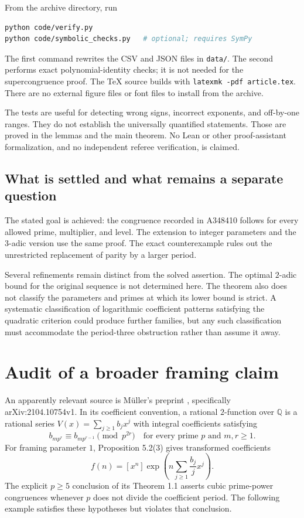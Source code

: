 \documentclass[11pt,a4paper]{article}
\numberwithin{equation}{section}
\theoremstyle{definition}
\theoremstyle{remark}
\newcommand{\Q}{\mathbb Q}
\begin{document}
From the archive directory, run
\begin{lstlisting}[language=bash]
python code/verify.py
python code/symbolic_checks.py   # optional; requires SymPy
\end{lstlisting}
The first command rewrites the CSV and JSON files in \texttt{data/}.
The second performs exact polynomial-identity checks; it is not needed
for the supercongruence proof. The TeX source builds with
\texttt{latexmk -pdf article.tex}. There are no external figure files or
font files to install from the archive.

The tests are useful for detecting wrong signs, incorrect exponents,
and off-by-one ranges. They do not establish the universally quantified
statements. Those are proved in the lemmas and the main theorem. No
Lean or other proof-assistant formalization, and no independent referee
verification, is claimed.

\subsection{What is settled and what remains a separate question}

The stated goal is achieved: the congruence recorded in A348410 follows
for every allowed prime, multiplier, and level. The extension to integer
parameters and the $3$-adic version use the same proof. The exact
counterexample rules out the unrestricted replacement of parity by a
larger period.

Several refinements remain distinct from the solved assertion. The
optimal $2$-adic bound for the original sequence is not determined here.
The theorem also does not classify the parameters and primes at which
its lower bound is strict. A systematic classification of logarithmic
coefficient patterns satisfying the quadratic criterion could produce
further families, but any such classification must accommodate the
period-three obstruction rather than assume it away.

\appendix
\section{Audit of a broader framing claim}\label{app:audit}

An apparently relevant source is M\"uller's preprint
\cite{mueller}, specifically arXiv:2104.10754v1. In its coefficient
convention, a rational $2$-function over $\Q$ is a rational series
$V(x)=\sum_{j\geq1}b_jx^j$ with integral coefficients satisfying
\begin{equation}\label{eq:two-function}
 b_{mp^r}\equiv b_{mp^{r-1}}\pmod{p^{2r}}
 \quad\text{for every prime }p\text{ and }m,r\geq1.
\end{equation}
For framing parameter $1$, Proposition 5.2(3) gives transformed
coefficients
\begin{equation}\label{eq:framing}
 f(n)=[x^n]\exp\left(n\sum_{j\geq1}\frac{b_j}{j}x^j\right).
\end{equation}
The explicit $p\geq5$ conclusion of its Theorem 1.1 asserts cubic
prime-power congruences whenever $p$ does not divide the coefficient
period. The following example satisfies these hypotheses but violates
that conclusion.
\end{document}
